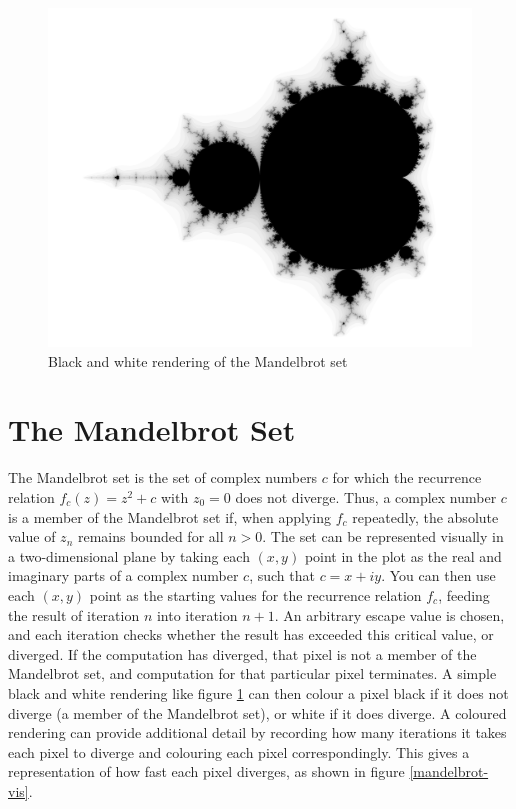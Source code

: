 \documentclass[bsc,frontabs,twoside,singlespacing,parskip,deptreport]{infthesis}     %
\begin{document}
\begin{figure}[h]
    \centering
    \includegraphics[scale=0.15]{mandelbrot-bw.jpg}
    \caption{Black and white rendering of the Mandelbrot set \cite{mandelbrot-bw}}
    \label{mandelbrot-bw}
\end{figure}

\section{The Mandelbrot Set}
The Mandelbrot set is the set of complex numbers $c$ for which the recurrence relation $f_{c}(z) = z^2 +c$ with $z_{0}=0$ does not diverge. Thus, a complex number $c$ is a member of the Mandelbrot set if, when applying $f_{c}$ repeatedly, the absolute value of $z_{n}$ remains bounded for all $n>0$. The set can be represented visually in a two-dimensional plane by taking each $(x,y)$ point in the plot as the real and imaginary parts of a complex number $c$, such that $c=x+iy$. You can then use each $(x,y)$ point as the starting values for the recurrence relation $f_{c}$, feeding the result of iteration $n$ into iteration $n+1$. An arbitrary escape value is chosen, and each iteration checks whether the result has exceeded this critical value, or diverged. If the computation has diverged, that pixel is not a member of the Mandelbrot set, and computation for that particular pixel terminates. A simple black and white rendering like figure \ref{mandelbrot-bw} can then colour a pixel black if it does not diverge (a member of the Mandelbrot set), or white if it does diverge. A coloured rendering can provide additional detail by recording how many iterations it takes each pixel to diverge and colouring each pixel correspondingly. This gives a representation of how fast each pixel diverges, as shown in figure \ref{mandelbrot-vis}.
\end{document}
